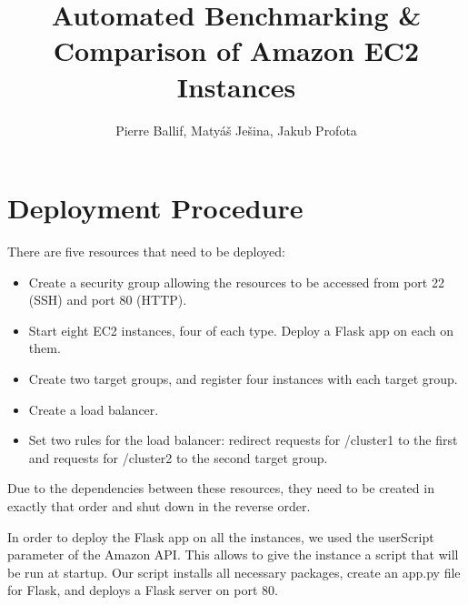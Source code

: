 \documentclass[]{article}
\title{Automated Benchmarking \& Comparison of Amazon EC2 Instances}
\author{Pierre Ballif, Matyáš Ješina, Jakub Profota}
\begin{document}
\begin{comment}
In your report, answer the following questions:
•1) Flask Application Deployment Procedure
•2) Cluster setup using Application Load Balancer
•3) Results of your benchmark
•4) Instructions to run your code

Your assignment will be graded on content as following:
•2 pts: Description of the environment setup and all necessary steps;
•2 pts: Validation of the environment setup;
•6 pts: Results and analysis of your benchmarks;
•3 pts: Automated benchmarking;
•6 pts: Demo;
•1 pts: General presentation and the quality of the report. It is important to
respect the format of the submission. Please use LaTeX!
\end{comment}

\maketitle

\begin{abstract}

\end{abstract}

\section{Deployment Procedure}

There are five resources that need to be deployed:
\begin{itemize}
	\item Create a security group allowing the resources to be accessed from port 22 (SSH) and port 80 (HTTP).
	\item Start eight EC2 instances, four of each type. Deploy a Flask app on each on them.
	\item Create two target groups, and register four instances with each target group.
	\item Create a load balancer.
	\item Set two rules for the load balancer: redirect requests for /cluster1 to the first and requests for /cluster2 to the second target group.
\end{itemize}

Due to the dependencies between these resources, they need to be created in exactly that order and shut down in the reverse order.

In order to deploy the Flask app on all the instances, we used the userScript parameter of the Amazon API. This allows to give the instance a script that will be run at startup. Our script installs all necessary packages, create an app.py file for Flask, and deploys a Flask server on port 80.
\end{document}
